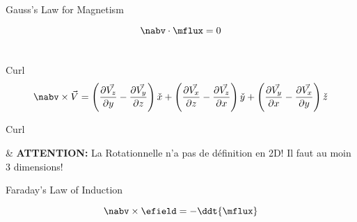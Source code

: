 \begin{frame}{Gauss's Law for Magnetism}
    \begin{twocolumns}[0.35]
        \leftcol
            \vspace{-8pt}
            \begin{equation}
                \nabv \cdot \mflux = 0
            \end{equation}\\
            \vspace{10pt}
        \rightcol
    \end{twocolumns}
\end{frame}



\begin{frame}{Curl}
    \begin{equation}
        \nabv \times \vec{V} = \left(\frac{\partial\vec{V_z}}{\partial y}-\frac{\partial\vec{V_y}}{\partial z} \right) \check{x} +
        \left(\frac{\partial\vec{V_x}}{\partial z}-\frac{\partial\vec{V_z}}{\partial x} \right) \check{y} +
        \left(\frac{\partial\vec{V_y}}{\partial x}-\frac{\partial\vec{V_x}}{\partial y} \right) \check{z}
    \end{equation}

\begin{twocolumns}[0.5]
    \leftcol
    \rightcol
 \end{twocolumns}
\end{frame}

\begin{frame}{Curl}
    \begin{makelist}[\small][1.5]
        \icon[red]{\faExclamationTriangle} & \textbf{ATTENTION:} La Rotationnelle n'a pas de définition en 2D! Il faut au moin 3 dimensions!
    \end{makelist}
\end{frame}

\begin{frame}{Faraday's Law of Induction}
    \begin{twocolumns}[0.35]
    \leftcol
        \vspace{-10pt}
        \begin{equation}
            \nabv \times \efield = -\ddt{\mflux}
        \end{equation}
    \rightcol
 \end{twocolumns}

\end{frame}


